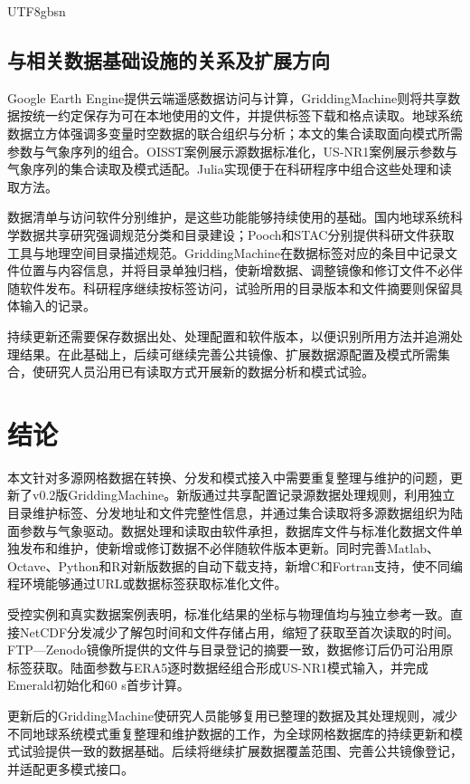 \documentclass[numdoi]{chinese}
\begin{document}
\begin{CJK}{UTF8}{gbsn}
\subsection{与相关数据基础设施的关系及扩展方向}
Google Earth Engine提供云端遥感数据访问与计算\cite{ref1}，GriddingMachine则将共享数据按统一约定保存为可在本地使用的文件，并提供标签下载和格点读取。地球系统数据立方体强调多变量时空数据的联合组织与分析\cite{ref9}；本文的集合读取面向模式所需参数与气象序列的组合。OISST案例展示源数据标准化，US-NR1案例展示参数与气象序列的集合读取及模式适配。Julia实现便于在科研程序中组合这些处理和读取方法\cite{ref10}。

数据清单与访问软件分别维护，是这些功能能够持续使用的基础。国内地球系统科学数据共享研究强调规范分类和目录建设\cite{ref11}；Pooch和STAC分别提供科研文件获取工具与地理空间目录描述规范\cite{ref12,ref13}。GriddingMachine在数据标签对应的条目中记录文件位置与内容信息，并将目录单独归档，使新增数据、\allowbreak{}调整镜像和修订文件不必伴随软件发布。科研程序继续按标签访问，试验所用的目录版本和文件摘要则保留具体输入的记录。

持续更新还需要保存数据出处、\allowbreak{}处理配置和软件版本，以便识别所用方法并追溯处理结果\cite{ref14,ref15}。在此基础上，后续可继续完善公共镜像、\allowbreak{}扩展数据源配置及模式所需集合，使研究人员沿用已有读取方式开展新的数据分析和模式试验。

\section{结论}
本文针对多源网格数据在转换、\allowbreak{}分发和模式接入中需要重复整理与维护的问题，更新了v0.2版GriddingMachine。新版通过共享配置记录源数据处理规则，利用独立目录维护标签、\allowbreak{}分发地址和文件完整性信息，并通过集合读取将多源数据组织为陆面参数与气象驱动。数据处理和读取由软件承担，数据库文件与标准化数据文件单独发布和维护，使新增或修订数据不必伴随软件版本更新。同时完善Matlab、\allowbreak{}Octave、\allowbreak{}Python和R对新版数据的自动下载支持，新增C和Fortran支持，使不同编程环境能够通过URL或数据标签获取标准化文件。

受控实例和真实数据案例表明，标准化结果的坐标与物理值均与独立参考一致。直接NetCDF分发减少了解包时间和文件存储占用，缩短了获取至首次读取的时间。FTP—Zenodo镜像所提供的文件与目录登记的摘要一致，数据修订后仍可沿用原标签获取。陆面参数与ERA5逐时数据经组合形成US-NR1模式输入，并完成Emerald初始化和60 s首步计算。

更新后的GriddingMachine使研究人员能够复用已整理的数据及其处理规则，减少不同地球系统模式重复整理和维护数据的工作，为全球网格数据库的持续更新和模式试验提供一致的数据基础。后续将继续扩展数据覆盖范围、完善公共镜像登记，并适配更多模式接口。


\end{CJK}
\end{document}
